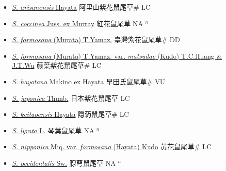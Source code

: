 \begin{itemize}
  \begin{itemize}
        \item[] \href{http://www.theplantlist.org/tpl1.1/search?q=Salvia+arisanensis}{\textit{S. arisanensis} Hayata}   阿里山紫花鼠尾草\# LC
        \item[] \href{http://www.theplantlist.org/tpl1.1/search?q=Salvia+coccinea}{\textit{S. coccinea} Juss. ex Murray}   紅花鼠尾草 NA $^n$
        \item[] \href{http://www.theplantlist.org/tpl1.1/search?q=Salvia+formosana}{\textit{S. formosana} (Murata) T.Yamaz.}   臺灣紫花鼠尾草\# DD
        \item[] \href{http://www.theplantlist.org/tpl1.1/search?q=Salvia+formosana+var.+matsudae}{\textit{S. formosana} (Murata) T.Yamaz. var. \textit{matsudae} (Kudo) T.C.Huang \& J.T.Wu}   蕨葉紫花鼠尾草\# LC
        \item[] \href{http://www.theplantlist.org/tpl1.1/search?q=Salvia+hayatana}{\textit{S. hayatana} Makino ex Hayata}   早田氏鼠尾草\# VU
        \item[] \href{http://www.theplantlist.org/tpl1.1/search?q=Salvia+japonica}{\textit{S. japonica} Thunb.}   日本紫花鼠尾草 LC
        \item[] \href{http://www.theplantlist.org/tpl1.1/search?q=Salvia+keitaoensis}{\textit{S. keitaoensis} Hayata}   隱葯鼠尾草\# LC
        \item[] \href{http://www.theplantlist.org/tpl1.1/search?q=Salvia+lyrata}{\textit{S. lyrata} L.}   琴葉鼠尾草 NA $^n$
        \item[] \href{http://www.theplantlist.org/tpl1.1/search?q=Salvia+nipponica+var.+formosana}{\textit{S. nipponica} Miq. var. \textit{formosana} (Hayata) Kudo}   黃花鼠尾草\# LC
        \item[] \href{http://www.theplantlist.org/tpl1.1/search?q=Salvia+occidentalis}{\textit{S. occidentalis} Sw.}   腺萼鼠尾草 NA $^n$

\end{itemize}
\end{itemize}
